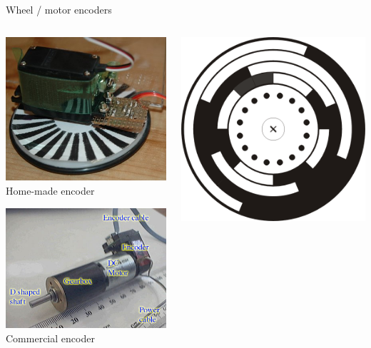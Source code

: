 \documentclass[compress]{beamer}
\begin{document}
\begin{frame}{Wheel / motor encoders}


    \begin{columns}
        \begin{column}{0.5\linewidth}
            \centering

            \includegraphics[width=0.6\linewidth]{encoders3}
            Home-made encoder

            \includegraphics[width=0.6\linewidth]{encoders5}
            Commercial encoder

        \end{column}

        \begin{column}{0.5\linewidth}
            \centering

            \includegraphics[width=0.9\linewidth]{encoders4}


\end{column}
\end{columns}
\end{frame}
\end{document}

